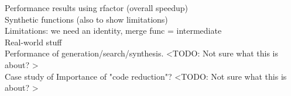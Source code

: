 Performance results using rfactor (overall speedup) \\

Synthetic functions (also to show limitations) \\

Limitations: we need an identity, merge func = intermediate \\

Real-world stuff \\

Performance of generation/search/synthesis. <TODO: Not sure what this is about? > \\

Case study of Importance of "code reduction"? <TODO: Not sure what this is about? > \\ 